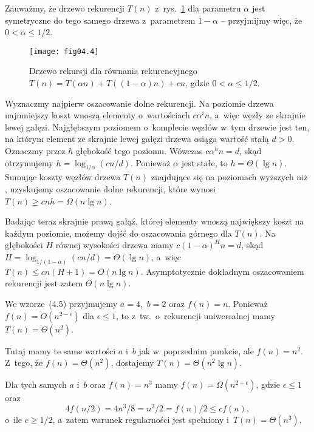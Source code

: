 \exercise %
Zauważmy, że drzewo rekurencji $T(n)$ z~rys.~\ref{fig:4.2-5} dla parametru $\alpha$ jest symetryczne do tego samego drzewa z~parametrem $1-\alpha$ -- przyjmijmy więc, że $0<\alpha\le1/2$.
\begin{figure}[ht]
	\begin{center}
		\texttt{[image: fig04.4]}
	\end{center}
	\caption{Drzewo rekursji dla równania rekurencyjnego $T(n)=T(\alpha n)+T((1-\alpha)n)+cn$, gdzie $0<\alpha\le1/2$.} \label{fig:4.2-5}
\end{figure}

Wyznaczmy najpierw oszacowanie dolne rekurencji. Na  poziomie drzewa najmniejszy koszt wnoszą elementy o~wartościach $c\alpha^in$, a~więc węzły ze skrajnie lewej gałęzi. Najgłębszym poziomem o~komplecie węzłów w~tym drzewie jest ten, na którym element ze skrajnie lewej gałęzi drzewa osiąga wartość stałą $d>0$. Oznaczmy przez $h$ głębokość tego poziomu. Wówczas $c\alpha^hn=d$, skąd otrzymujemy $h=\log_{1/\alpha}(cn/d)$. Ponieważ $\alpha$ jest stałe, to $h=\Theta(\lg n)$. Sumując koszty węzłów drzewa $T(n)$ znajdujące się na poziomach wyższych niż , uzyskujemy oszacowanie dolne rekurencji, które wynosi $T(n)\ge cnh=\Omega(n\lg n)$.

Badając teraz skrajnie prawą gałąź, której elementy wnoszą największy koszt na każdym poziomie, możemy dojść do oszacowania górnego dla $T(n)$. Na głębokości $H$ równej wysokości drzewa mamy $c(1-\alpha)^Hn=d$, skąd $H=\log_{1/(1-\alpha)}(cn/d)=\Theta(\lg n)$, a~więc $T(n)\le cn(H+1)=O(n\lg n)$. Asymptotycznie dokładnym oszacowaniem rekurencji jest zatem $\Theta(n\lg n)$.


\exercise %

\subexercise
We wzorze~(4.5) przyjmujemy $a=4$,~$b=2$ oraz $f(n)=n$. Ponieważ $f(n)=O(n^{2-\epsilon})$ dla $\epsilon\le1$, to z~tw.~o~rekurencji uniwersalnej mamy $T(n)=\Theta(n^2)$.

\subexercise
Tutaj mamy te same wartości $a$ i~$b$ jak w~poprzednim punkcie, ale $f(n)=n^2$. Z~tego, że $f(n)=\Theta(n^2)$, dostajemy $T(n)=\Theta(n^2\lg n)$.

\subexercise
Dla tych samych $a$ i~$b$ oraz $f(n)=n^3$ mamy $f(n)=\Omega(n^{2+\epsilon})$, gdzie $\epsilon\le1$ oraz
\[
	4f(n/2) = 4n^3\!/8 = n^3\!/2 = f(n)/2 \le cf(n),
\]
o~ile $c\ge1/2$, a~zatem warunek regularności jest spełniony i~$T(n)=\Theta(n^3)$.

